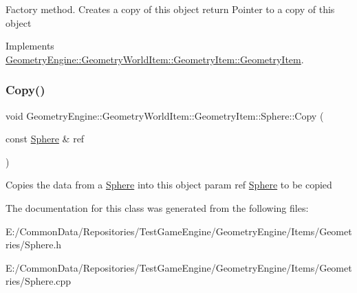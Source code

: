 Factory method. Creates a copy of this object return Pointer to a copy of this object 

Implements \mbox{\hyperlink{class_geometry_engine_1_1_geometry_world_item_1_1_geometry_item_1_1_geometry_item_a1db8f97339ba49f746b3e0b4c4b02748}{Geometry\+Engine\+::\+Geometry\+World\+Item\+::\+Geometry\+Item\+::\+Geometry\+Item}}.

\mbox{\label{class_geometry_engine_1_1_geometry_world_item_1_1_geometry_item_1_1_sphere_a2124223c5454a1759f25ffad90157e06}} 
\subsubsection{\texorpdfstring{Copy()}{Copy()}}
{\footnotesize\ttfamily void Geometry\+Engine\+::\+Geometry\+World\+Item\+::\+Geometry\+Item\+::\+Sphere\+::\+Copy (\begin{DoxyParamCaption}\item[{const \mbox{\hyperlink{class_geometry_engine_1_1_geometry_world_item_1_1_geometry_item_1_1_sphere}{Sphere}} \&}]{ref }\end{DoxyParamCaption})\hspace{0.3cm}{\ttfamily [virtual]}}

Copies the data from a \mbox{\hyperlink{class_geometry_engine_1_1_geometry_world_item_1_1_geometry_item_1_1_sphere}{Sphere}} into this object param ref \mbox{\hyperlink{class_geometry_engine_1_1_geometry_world_item_1_1_geometry_item_1_1_sphere}{Sphere}} to be copied 

The documentation for this class was generated from the following files\+:\begin{DoxyCompactItemize}
\item 
E\+:/\+Common\+Data/\+Repositories/\+Test\+Game\+Engine/\+Geometry\+Engine/\+Items/\+Geometries/Sphere.\+h\item 
E\+:/\+Common\+Data/\+Repositories/\+Test\+Game\+Engine/\+Geometry\+Engine/\+Items/\+Geometries/Sphere.\+cpp\end{DoxyCompactItemize}
